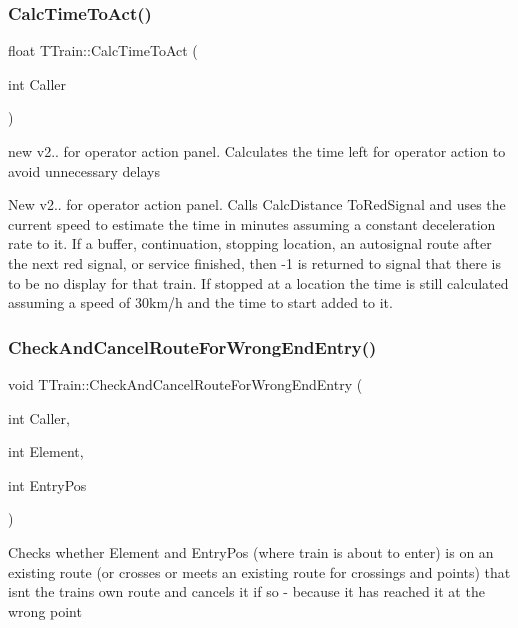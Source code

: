 \subsubsection{\texorpdfstring{Calc\+Time\+To\+Act()}{CalcTimeToAct()}}
{\footnotesize\ttfamily float T\+Train\+::\+Calc\+Time\+To\+Act (\begin{DoxyParamCaption}\item[{int}]{Caller }\end{DoxyParamCaption})\hspace{0.3cm}{\ttfamily [private]}}



new v2.. for operator action panel. Calculates the time left for operator action to avoid unnecessary delays 

New v2.. for operator action panel. Calls Calc\+Distance To\+Red\+Signal and uses the current speed to estimate the time in minutes assuming a constant deceleration rate to it. If a buffer, continuation, stopping location, an autosignal route after the next red signal, or service finished, then -\/1 is returned to signal that there is to be no display for that train. If stopped at a location the time is still calculated assuming a speed of 30km/h and the time to start added to it. \mbox{\label{class_t_train_a50997f7e8138a7e6a147fe3b5ad21b84}} 
\subsubsection{\texorpdfstring{Check\+And\+Cancel\+Route\+For\+Wrong\+End\+Entry()}{CheckAndCancelRouteForWrongEndEntry()}}
{\footnotesize\ttfamily void T\+Train\+::\+Check\+And\+Cancel\+Route\+For\+Wrong\+End\+Entry (\begin{DoxyParamCaption}\item[{int}]{Caller,  }\item[{int}]{Element,  }\item[{int}]{Entry\+Pos }\end{DoxyParamCaption})\hspace{0.3cm}{\ttfamily [private]}}

Checks whether Element and Entry\+Pos (where train is about to enter) is on an existing route (or crosses or meets an existing route for crossings and points) that isn\textquotesingle{}t the train\textquotesingle{}s own route and cancels it if so -\/ because it has reached it at the wrong point \mbox{\label{class_t_train_aad716bab6f8f4aa6dd49f35130d28dd9}} 

